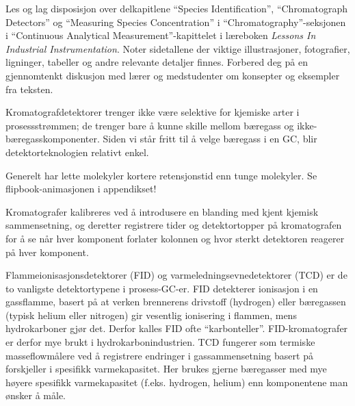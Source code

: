 

Les og lag disposisjon over delkapitlene ``Species Identification'', ``Chromatograph Detectors'' og ``Measuring Species Concentration'' i ``Chromatography''-seksjonen i ``Continuous Analytical Measurement''-kapittelet i læreboken {\it Lessons In Industrial Instrumentation}.  Noter sidetallene der viktige illustrasjoner, fotografier, ligninger, tabeller og andre relevante detaljer finnes.  Forbered deg på en gjennomtenkt diskusjon med lærer og medstudenter om konsepter og eksempler fra teksten.














Kromatografdetektorer trenger ikke være selektive for kjemiske arter i prosessstrømmen; de trenger bare å kunne skille mellom bæregass og ikke-bæregasskomponenter.  Siden vi står fritt til å velge bæregass i en GC, blir detektorteknologien relativt enkel.

\vskip 10pt

Generelt har lette molekyler kortere retensjonstid enn tunge molekyler.  Se flipbook-animasjonen i appendikset!

\vskip 10pt

Kromatografer kalibreres ved å introdusere en blanding med kjent kjemisk sammensetning, og deretter registrere tider og detektortopper på kromatografen for å se når hver komponent forlater kolonnen og hvor sterkt detektoren reagerer på hver komponent.

\vskip 10pt

Flammeionisasjonsdetektorer (FID) og varmeledningsevnedetektorer (TCD) er de to vanligste detektortypene i prosess-GC-er.  FID detekterer ionisasjon i en gassflamme, basert på at verken brennerens drivstoff (hydrogen) eller bæregassen (typisk helium eller nitrogen) gir vesentlig ionisering i flammen, mens hydrokarboner gjør det.  Derfor kalles FID ofte ``karbonteller''.  FID-kromatografer er derfor mye brukt i hydrokarbonindustrien.  TCD fungerer som termiske masseflowmålere ved å registrere endringer i gassammensetning basert på forskjeller i spesifikk varmekapasitet.  Her brukes gjerne bæregasser med mye høyere spesifikk varmekapasitet (f.eks. hydrogen, helium) enn komponentene man ønsker å måle.

